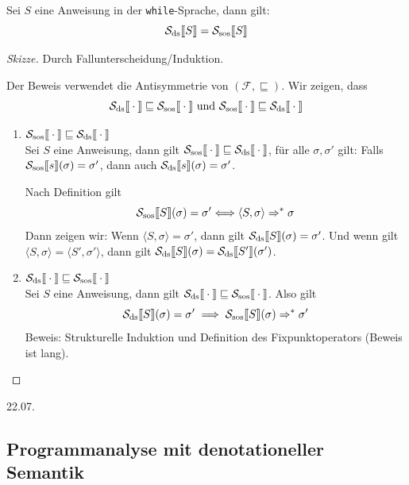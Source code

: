 \begin{theorem}
    Sei $S$ eine Anweisung in der \texttt{while}-Sprache, dann gilt: \[
        \Sdssem{S} = \Ssossem{S}
    \]
\end{theorem}

\begin{proof}[Skizze]
    Durch Fallunterscheidung/Induktion.

    Der Beweis verwendet die Antisymmetrie von $(\mathcal{F}, \sqsubseteq)$. Wir zeigen, dass \[
        \Sdssem{\cdot} \sqsubseteq \Ssossem{\cdot} \text{ und } \Ssossem{\cdot} \sqsubseteq \Sdssem{\cdot}
    \]

    \begin{enumerate}
        \item $\Ssossem{\cdot} \sqsubseteq \Sdssem{\cdot}$ \\
            Sei $S$ eine Anweisung, dann gilt $\Ssossem{\cdot} \sqsubseteq \Sdssem{\cdot}$, \dh{} für alle $\sigma, \sigma'$ gilt:
            Falls $\Ssossem{s}(\sigma) = \sigma'$, dann auch $\Sdssem{s}(\sigma) = \sigma'$.

            Nach Definition gilt \[
                \Ssossem{S}(\sigma) = \sigma' \Longleftrightarrow \langle S, \sigma \rangle \Rightarrow^* \sigma
            \]
            Dann zeigen wir: Wenn $\langle S, \sigma \rangle = \sigma'$, dann gilt $\Sdssem{S}(\sigma)=\sigma'$.
            Und wenn gilt $\langle S, \sigma \rangle = \langle S', \sigma' \rangle$, dann gilt $\Sdssem{S}(\sigma) = \Sdssem{S'}(\sigma')$.

        \item $\Sdssem{\cdot} \sqsubseteq \Ssossem{\cdot}$ \\

            Sei $S$ eine Anweisung, dann gilt $\Sdssem{\cdot} \sqsubseteq \Ssossem{\cdot}$. Also gilt \[
                    \Sdssem{S}(\sigma) = \sigma' \implies \Ssossem{S}(\sigma) \Rightarrow^* \sigma'
            \]
            Beweis: Strukturelle Induktion und Definition des Fixpunktoperators (Beweis ist lang).
    \end{enumerate}
\end{proof}



\newpage
\hfill 22.07.

\subsection{Programmanalyse mit denotationeller Semantik}

